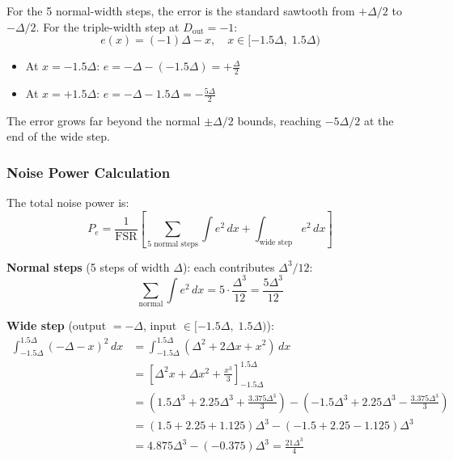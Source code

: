\documentclass{article}
\begin{document}
  For the 5 normal-width steps, the error is the standard sawtooth from $+\Delta/2$ to $-\Delta/2$. For the triple-width step at
   $D_\text{out} = -1$:
  \begin{equation}
      e(x) = (-1)\Delta - x, \quad x \in [-1.5\Delta,\; 1.5\Delta)
  \end{equation}
  \begin{itemize}
      \item At $x = -1.5\Delta$: $e = -\Delta - (-1.5\Delta) = +\frac{\Delta}{2}$
      \item At $x = +1.5\Delta$: $e = -\Delta - 1.5\Delta = -\frac{5\Delta}{2}$
  \end{itemize}
  The error grows far beyond the normal $\pm\Delta/2$ bounds, reaching $-5\Delta/2$ at the end of the wide step.

  \subsubsection{Noise Power Calculation}

  The total noise power is:
  \begin{equation}
      P_e = \frac{1}{\text{FSR}} \left[\sum_{\text{5 normal steps}} \int e^2\, dx + \int_{\text{wide step}} e^2\, dx \right]
  \end{equation}

  \textbf{Normal steps} (5 steps of width $\Delta$): each contributes $\Delta^3/12$:
  \begin{equation}
      \sum_{\text{normal}} \int e^2\, dx = 5 \cdot \frac{\Delta^3}{12} = \frac{5\Delta^3}{12}
  \end{equation}

  \textbf{Wide step} (output $= -\Delta$, input $\in [-1.5\Delta,\; 1.5\Delta)$):
  \begin{align}
      \int_{-1.5\Delta}^{1.5\Delta} (-\Delta - x)^2\, dx
      &= \int_{-1.5\Delta}^{1.5\Delta} (\Delta^2 + 2\Delta x + x^2)\, dx \nonumber \\
      &= \left[\Delta^2 x + \Delta x^2 + \frac{x^3}{3}\right]_{-1.5\Delta}^{1.5\Delta} \nonumber \\
      &= \left(1.5\Delta^3 + 2.25\Delta^3 + \frac{3.375\Delta^3}{3}\right) - \left(-1.5\Delta^3 + 2.25\Delta^3 -
  \frac{3.375\Delta^3}{3}\right) \nonumber \\
      &= (1.5 + 2.25 + 1.125)\Delta^3 - (-1.5 + 2.25 - 1.125)\Delta^3 \nonumber \\
      &= 4.875\Delta^3 - (-0.375)\Delta^3 = \frac{21\Delta^3}{4}
  \end{align}
\end{document}
